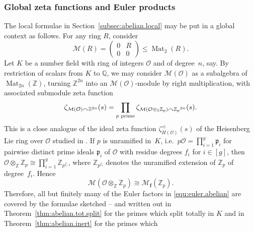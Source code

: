 \documentclass[11pt]{amsart}
\numberwithin{equation}{section}
\numberwithin{figure}{section}
\theoremstyle{plain}
\theoremstyle{definition}
\theoremstyle{remark}
\begin{document}
\subsubsection{Global zeta functions and Euler products} The local
formulae in Section~\ref{subsec:abelian.local} may be put in a global
context as follows. For any ring $R$, consider
$${\mathcal{M}}(R) = \left( \begin{matrix}0 & R \\ 0 & 0 \end{matrix}\right)
\leq \operatorname{Mat}_2(R).$$ Let $K$ be a number field with ring of integers
${\ensuremath{\mathcal{O}}}$ and of degree~$n$, say. By restriction of scalars from $K$ to
${\ensuremath{\mathbb{Q}}}$, we may consider ${\mathcal{M}}({\ensuremath{\mathcal{O}}})$ as a subalgebra of $\operatorname{Mat}_{2n}({\ensuremath{\mathbb{Z}}})$,
turning ${\ensuremath{\mathbb{Z}}}^{2n}$ into an ${\mathcal{M}}({\ensuremath{\mathcal{O}}})$-module by right multiplication,
with associated submodule zeta function
\begin{equation}\label{equ:euler.abelian}
  \zeta_{{\mathcal{M}}({\ensuremath{\mathcal{O}}}) {\curvearrowright} {\ensuremath{\mathbb{Z}}}^{2n}}(s) = \prod_{p \textup{ prime}}
  \zeta_{{\mathcal{M}}({\ensuremath{\mathcal{O}}}\otimes_{\ensuremath{\mathbb{Z}}}{\ensuremath{\mathbb{Z}_p}}) {\curvearrowright} {\ensuremath{\mathbb{Z}_p}}^{2n}}(s).
\end{equation}
This is a close analogue of the ideal zeta function
$\zeta^{\triangleleft}_{H({\ensuremath{\mathcal{O}}})}(s)$ of the Heisenberg Lie ring over ${\ensuremath{\mathcal{O}}}$
studied in \cite{SV1/15}. If $p$ is unramified in~$K$, i.e.\ $p{\ensuremath{\mathcal{O}}} =
\prod_{i=1}^g {\mathfrak{p}}_i$ for pairwise distinct prime ideals ${\mathfrak{p}}_i$ of
${\ensuremath{\mathcal{O}}}$ with residue degrees $f_i$ for $i\in[g]$, then
${\ensuremath{\mathcal{O}}}\otimes_{\ensuremath{\mathbb{Z}}}{\ensuremath{\mathbb{Z}_p}} \cong \prod_{i=1}^g {\ensuremath{\mathbb{Z}}}_{p^{f_i}}$, where
${\ensuremath{\mathbb{Z}}}_{p^{f_i}}$ denotes the unramified extension of ${\ensuremath{\mathbb{Z}_p}}$ of
degree~$f_i$. Hence
$${\mathcal{M}}({\ensuremath{\mathcal{O}}}\otimes_{\ensuremath{\mathbb{Z}}}{\ensuremath{\mathbb{Z}_p}}) \cong {\mathcal{M}}_{\ensuremath{\mathbf{f}}}({\ensuremath{\mathbb{Z}_p}}).$$ Therefore, all but
finitely many of the Euler factors in \eqref{equ:euler.abelian} are
covered by the formulae sketched -- and written out in
Theorem~\ref{thm:abelian.tot.split} for the primes which split totally
in $K$ and in Theorem~\ref{thm:abelian.inert} for the primes which
\end{document}

